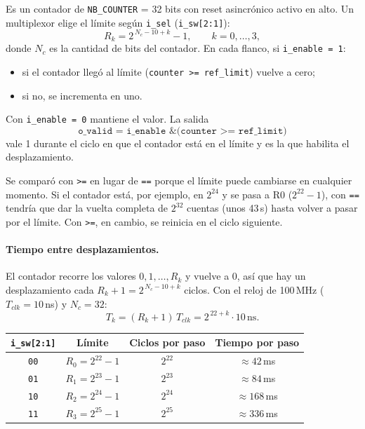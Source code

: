 \documentclass[11pt,a4paper]{scrartcl}
\newcommand{\sig}[1]{\texttt{#1}}
\begin{document}
	Es un contador de \sig{NB\_COUNTER} = 32 bits con reset asincrónico activo en alto. Un
	multiplexor elige el límite según \sig{i\_sel} (\sig{i\_sw[2:1]}):
	\[
		R_k = 2^{\,N_{c} - 10 + k} - 1, \qquad k = 0,\dots,3 ,
	\]
	donde $N_c$ es la cantidad de bits del contador. En cada flanco, si \sig{i\_enable = 1}:

	\begin{itemize}
		\item si el contador llegó al límite (\sig{counter >= ref\_limit}) vuelve a cero;
		\item si no, se incrementa en uno.
	\end{itemize}

	Con \sig{i\_enable = 0} mantiene el valor. La salida
	\[
		\sig{o\_valid = i\_enable \& (counter >= ref\_limit)}
	\]
	vale 1 durante el ciclo en que el contador está en el límite y es la que habilita el
	desplazamiento.

	Se comparó con \sig{>=} en lugar de \sig{==} porque el límite puede cambiarse en
	cualquier momento. Si el contador está, por ejemplo, en $2^{24}$ y se pasa a R0
	($2^{22}-1$), con \sig{==} tendría que dar la vuelta completa de $2^{32}$ cuentas (unos
	43\,s) hasta volver a pasar por el límite. Con \sig{>=}, en cambio, se reinicia en el
	ciclo siguiente.

	\paragraph{Tiempo entre desplazamientos.} El contador recorre los valores $0, 1, \dots, R_k$
	y vuelve a 0, así que hay un desplazamiento cada $R_k + 1 = 2^{\,N_c-10+k}$ ciclos. Con el
	reloj de 100\,MHz ($T_{clk} = 10$\,ns) y $N_c = 32$:
	\[
		T_k = (R_k + 1)\, T_{clk} = 2^{\,22+k} \cdot 10\,\text{ns} .
	\]

	\begin{table}[H]
		\centering
		\begin{tabular}{@{}cccc@{}}
			\toprule
			\sig{i\_sw[2:1]} & Límite & Ciclos por paso & Tiempo por paso \\
			\midrule
			\sig{00} & $R_0 = 2^{22}-1$ & $2^{22}$ & $\approx 42$\,ms \\
			\sig{01} & $R_1 = 2^{23}-1$ & $2^{23}$ & $\approx 84$\,ms \\
			\sig{10} & $R_2 = 2^{24}-1$ & $2^{24}$ & $\approx 168$\,ms \\
			\sig{11} & $R_3 = 2^{25}-1$ & $2^{25}$ & $\approx 336$\,ms \\
			\bottomrule
		\end{tabular}
	\end{table}
\end{document}
